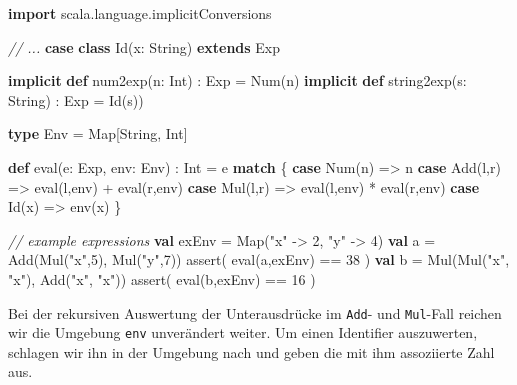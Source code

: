 \documentclass[]{article}
\newenvironment{Shaded}{}{}
\newcommand{\CommentTok}[1]{\textcolor[rgb]{0.38,0.63,0.69}{\textit{#1}}}
\newcommand{\DecValTok}[1]{\textcolor[rgb]{0.25,0.63,0.44}{#1}}
\newcommand{\FunctionTok}[1]{\textcolor[rgb]{0.02,0.16,0.49}{#1}}
\newcommand{\KeywordTok}[1]{\textcolor[rgb]{0.00,0.44,0.13}{\textbf{#1}}}
\newcommand{\NormalTok}[1]{#1}
\newcommand{\StringTok}[1]{\textcolor[rgb]{0.25,0.44,0.63}{#1}}
\begin{document}
\begin{Shaded}
\begin{Highlighting}[]
\KeywordTok{import}\NormalTok{ scala.}\FunctionTok{language}\NormalTok{.}\FunctionTok{implicitConversions}

\CommentTok{// ...}
\KeywordTok{case} \KeywordTok{class} \FunctionTok{Id}\NormalTok{(x: String) }\KeywordTok{extends}\NormalTok{ Exp}

\KeywordTok{implicit} \KeywordTok{def} \FunctionTok{num2exp}\NormalTok{(n: Int) : Exp = }\FunctionTok{Num}\NormalTok{(n)}
\KeywordTok{implicit} \KeywordTok{def} \FunctionTok{string2exp}\NormalTok{(s: String) : Exp = }\FunctionTok{Id}\NormalTok{(s))}

\KeywordTok{type}\NormalTok{ Env = Map[String, Int]}

\KeywordTok{def} \FunctionTok{eval}\NormalTok{(e: Exp, env: Env) : Int = e }\KeywordTok{match}\NormalTok{ \{}
  \KeywordTok{case} \FunctionTok{Num}\NormalTok{(n) =\textgreater{} n}
  \KeywordTok{case} \FunctionTok{Add}\NormalTok{(l,r) =\textgreater{} }\FunctionTok{eval}\NormalTok{(l,env) + }\FunctionTok{eval}\NormalTok{(r,env)}
  \KeywordTok{case} \FunctionTok{Mul}\NormalTok{(l,r) =\textgreater{} }\FunctionTok{eval}\NormalTok{(l,env) * }\FunctionTok{eval}\NormalTok{(r,env)}
  \KeywordTok{case} \FunctionTok{Id}\NormalTok{(x) =\textgreater{} }\FunctionTok{env}\NormalTok{(x)}
\NormalTok{\}}

\CommentTok{// example expressions}
\KeywordTok{val}\NormalTok{ exEnv = Map(}\StringTok{"x"}\NormalTok{ {-}\textgreater{} }\DecValTok{2}\NormalTok{, }\StringTok{"y"}\NormalTok{ {-}\textgreater{} }\DecValTok{4}\NormalTok{)}
\KeywordTok{val}\NormalTok{ a = }\FunctionTok{Add}\NormalTok{(}\FunctionTok{Mul}\NormalTok{(}\StringTok{"x"}\NormalTok{,}\DecValTok{5}\NormalTok{), }\FunctionTok{Mul}\NormalTok{(}\StringTok{"y"}\NormalTok{,}\DecValTok{7}\NormalTok{))}
\FunctionTok{assert}\NormalTok{( }\FunctionTok{eval}\NormalTok{(a,exEnv) == }\DecValTok{38}\NormalTok{ )}
\KeywordTok{val}\NormalTok{ b = }\FunctionTok{Mul}\NormalTok{(}\FunctionTok{Mul}\NormalTok{(}\StringTok{"x"}\NormalTok{, }\StringTok{"x"}\NormalTok{), }\FunctionTok{Add}\NormalTok{(}\StringTok{"x"}\NormalTok{, }\StringTok{"x"}\NormalTok{))}
\FunctionTok{assert}\NormalTok{( }\FunctionTok{eval}\NormalTok{(b,exEnv) == }\DecValTok{16}\NormalTok{ )}
\end{Highlighting}
\end{Shaded}

Bei der rekursiven Auswertung der Unterausdrücke im \texttt{Add}- und
\texttt{Mul}-Fall reichen wir die Umgebung \texttt{env} unverändert
weiter. Um einen Identifier auszuwerten, schlagen wir ihn in der
Umgebung nach und geben die mit ihm assoziierte Zahl aus.
\end{document}
